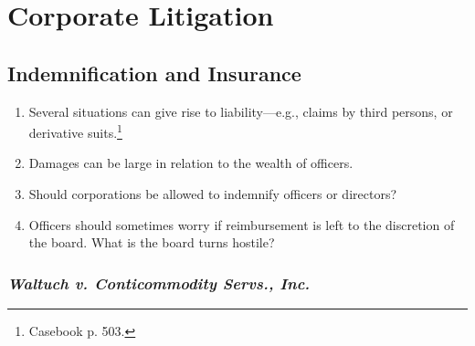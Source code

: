 \section{Corporate Litigation}

% 

\subsection{Indemnification and Insurance}

\begin{enumerate}
    \item Several situations can give rise to liability---e.g., claims by 
    third persons, or derivative suits.\footnote{Casebook p. 503.}
    \item Damages can be large in relation to the wealth of officers.
    \item Should corporations be allowed to indemnify officers or directors?
    \item Officers should sometimes worry if reimbursement is left to the 
    discretion of the board. What is the board turns hostile?
\end{enumerate}

\subsubsection{\emph{Waltuch v. Conticommodity Servs., Inc.}}

